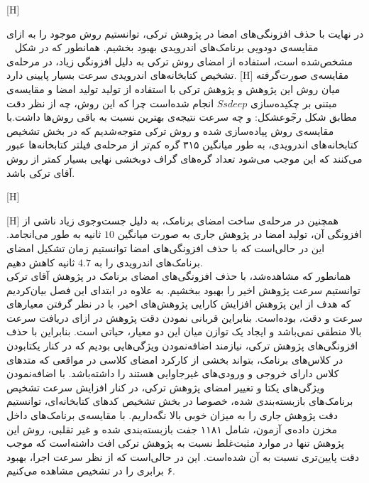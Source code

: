  
  [H]
 \vspace{1em}
 
 در نهایت با حذف افزونگی‌های امضا در پژوهش ترکی، توانستیم روش موجود را به ازای مقایسه‌ی دودویی برنامک‌های اندرویدی بهبود بخشیم. همانطور که در شکل ~ مشخص‌شده است، استفاده از امضای روش ترکی به دلیل افزونگی زیاد، در مرحله‌ی تشخیص کتابخانه‌های اندرویدی سرعت بسیار پایینی دارد. 
[H]
\vspace{1em}
مقایسه‌ی صورت‌گرفته میان روش‌ این پژوهش و پژوهش ترکی با استفاده از تولید تولید امضا و مقایسه‌ی مبتنی بر چکیده‌سازی $Ssdeep$ انجام شده‌است چرا که این روش، چه از نظر دقت مطابق شکل \~رجوع{شکل:} و چه سرعت نتیجه‌ی بهترین نسبت به باقی روش‌ها داشت.با مقایسه‌ی روش‌ پیاده‌سازی شده و روش ترکی متوجه‌شدیم که در بخش تشخیص کتابخانه‌های اندرویدی، به طور میانگین ۳۱۵ گره کم‌تر از مرحله‌ی فیلتر کتابخانه‌ها عبور می‌کنند که این موجب می‌شود تعداد گره‌های گراف دوبخشی نهایی بسیار کمتر از روش آقای ترکی باشد.

   [H]
 \vspace{1em}

 
   [H]
 \vspace{1em}
همچنین در مرحله‌ی ساخت امضای برنامک، به دلیل جست‌و‌جوی زیاد ناشی از افزونگی آن، تولید امضا در پژوهش جاری به صورت میانگین $10$ ثانیه به طور می‌انجامد. این در حالی‌است که با حذف افزونگی‌های امضا توانستیم زمان تشکیل امضای برنامک‌های اندرویدی را به $4.7$ ثانیه کاهش دهیم. \\
 همانطور که مشاهده‌شد، با حذف افزونگی‌های امضا‌ی برنامک در پژوهش آقای ترکی توانستیم سرعت پژوهش اخیر را بهبود ببخشیم. به علاوه در ابتدای این فصل بیان‌کردیم که هدف از این پژوهش افزایش کارایی پژوهش‌های اخیر، با در نظر گرفتن معیار‌های سرعت و دقت، بوده‌است. بنابراین قربانی نمودن دقت پژوهش در ازای دریافت سرعت بالا منطقی نمی‌باشد و ایجاد یک توازن میان این دو معیار، حیاتی است. بنابراین با حذف افزونگی‌های پژوهش ترکی، نیازمند اضافه‌نمودن ویژگی‌هایی بودیم که در کنار یکتابودن در کلاس‌های برنامک، بتواند بخشی از کارکرد امضای کلاسی در مواقعی که متد‌های کلاس دارای خروجی و ورودی‌های غیرجاوایی هستند را داشته‌باشد. با اضافه‌نمودن ویژگی‌های یکتا و تغییر امضای‌ پژوهش ترکی، در کنار افزایش سرعت تشخیص برنامک‌های بازبسته‌بندی شده، خصوصا در بخش تشخیص کد‌های کتابخانه‌ای، توانستیم دقت پژوهش جاری را به میزان خوبی بالا نگه‌داریم. با مقایسه‌ی برنامک‌های داخل مخزن داده‌ی آزمون، شامل ۱۱۸۱ جفت بازبسته‌بندی شده و غیر تقلبی، روش این پژوهش تنها در موارد مثبت‌غلط نسبت به پژوهش ترکی افت داشته‌است که موجب دقت پایین‌تری نسبت به آن شده‌است. این در حالی‌است که از نظر سرعت اجرا، بهبود ۶ برابری را در تشخیص مشاهده می‌کنیم.\\
 
